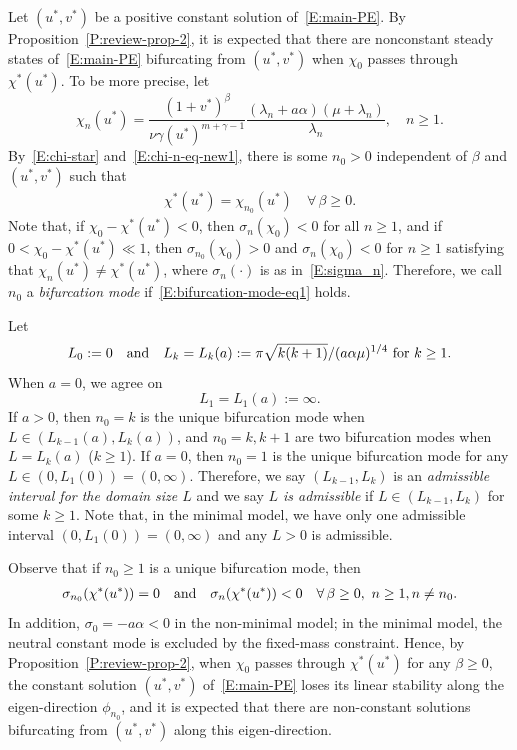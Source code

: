 \documentclass[11pt]{article} %
\theoremstyle{remark}
\theoremstyle{remark}
\numberwithin{equation}{section}
\numberwithin{figure}{section}
\numberwithin{table}{section}
\begin{document}
Let $(u^*,v^*)$ be a positive constant solution of~\eqref{E:main-PE}. By
Proposition~\ref{P:review-prop-2}, it is expected that there are nonconstant
steady states of~\eqref{E:main-PE} bifurcating from $(u^*,v^*)$ when $\chi_0$
passes through $\chi^*(u^*)$. To be more precise, let
\begin{equation}\label{E:chi-n-eq-new1}
  \chi_n(u^*)=\frac{(1+v^*)^\beta}{\nu\gamma(u^*)^{m+\gamma-1}}\frac{(\lambda_n+a\alpha)(\mu+\lambda_n)}{\lambda_n},
  \quad n \ge 1.
\end{equation}
By~\eqref{E:chi-star} and~\eqref{E:chi-n-eq-new1}, there is some $n_0 > 0$
independent of $\beta$ and $(u^*,v^*)$ such that
\begin{align}\label{E:bifurcation-mode-eq1}
  \chi^*(u^*)=\chi_{n_0}(u^*)\quad \forall\,\beta\ge 0.
\end{align}
Note that, if $\chi_0 - \chi^*(u^*) < 0$, then $\sigma_n(\chi_0) < 0$ for all $n
\ge 1$, and if $0 < \chi_0 - \chi^*(u^*)\ll 1$, then $\sigma_{n_0}(\chi_0) > 0$ and
$\sigma_n(\chi_0) < 0$ for $n \ge 1$  satisfying that $\chi_{n}(u^*)\not =
\chi^*(u^*)$,  where $\sigma_n(\cdot)$ is as in~\eqref{E:sigma_n}. Therefore,
we call $n_0$ a {\it bifurcation mode} if~\eqref{E:bifurcation-mode-eq1} holds.

Let
\begin{equation}\label{E:L0-Lk-eq}
  L_0:=0 \quad {\rm and}\quad L_k=L_k(a):=\pi\sqrt{k(k+1)}/(a\alpha\mu)^{1/4}\,\,
  {\rm for}\,\,  k\ge1.
\end{equation}
When $a = 0$, we agree on
\[
  L_1=L_1(a):=\infty.
\]
If $a > 0$, then $n_0 = k$ is the unique bifurcation mode when $L \in
(L_{k-1}(a), L_k(a))$, and $n_0 = k, k + 1$ are two bifurcation modes when $L =
L_k(a)$ ($k \ge 1$). If $a = 0$, then $n_0 = 1$ is the unique bifurcation mode
for any $L \in (0, L_1(0)) = (0, \infty)$. Therefore, we say $(L_{k-1}, L_k)$ is
an \textit{admissible interval for the domain size $L$} and we say {\it $L$ is
admissible} if $L \in (L_{k-1}, L_k)$ for some $k \ge 1$. Note that, in the
minimal model, we have only one admissible interval $(0, L_1(0)) = (0, \infty)$
and any $L > 0$ is admissible.


Observe that if $n_0 \ge 1$ is a unique bifurcation mode, then
\begin{align}\label{E:bifurcation-mode-eq2}
  \sigma_{n_0}(\chi^*(u^*))=0\quad {\rm and}\quad \sigma_{n}(\chi^*(u^*))<0
  \quad\forall\, \beta\ge 0,\, \,n\ge 1, n\not =n_0.
\end{align}
In addition, $\sigma_0 = - a\alpha < 0$ in the non-minimal model; in the minimal
model, the neutral constant mode is excluded by the fixed-mass constraint.
Hence, by Proposition~\ref{P:review-prop-2}, when $\chi_0$ passes through
$\chi^*(u^*)$ for any $\beta \ge 0$, the constant solution $(u^*,v^*)$
of~\eqref{E:main-PE} loses its linear stability along the eigen-direction
$\phi_{n_0}$, and it is expected that there are non-constant solutions
bifurcating from $(u^*,v^*)$ along this eigen-direction.
\end{document}
